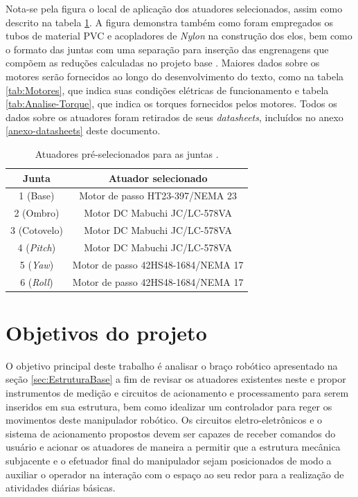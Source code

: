 Nota-se pela figura o local de aplicação dos atuadores selecionados, assim como descrito na tabela \ref{tab:AtuadoresPre}. A figura demonstra também como
foram empregados os tubos de material PVC e acopladores de \textit{Nylon} na construção dos elos, bem como o formato das juntas com uma separação para inserção
das engrenagens que compõem as reduções calculadas no projeto base \cite{fernando2019assistivo}. Maiores dados sobre os motores serão
fornecidos ao longo do desenvolvimento do texto, como na tabela \ref{tab:Motores}, que indica suas condições elétricas de funcionamento
e tabela \ref{tab:Analise-Torque}, que indica os torques fornecidos pelos motores. Todos os dados sobre os atuadores foram retirados
de seus \textit{datasheets}, incluídos no anexo \ref{anexo-datasheets} deste documento.

\begin{table}[h]
\begin{centering}  

\begin{tabular}{|c|c|}
    \hline
    Junta & Atuador selecionado \tabularnewline
    \hline
    \hline
    1 (Base) & Motor de passo HT23-397/NEMA 23 \tabularnewline
    \hline
    2 (Ombro) & Motor DC Mabuchi JC/LC-578VA \tabularnewline
    \hline
    3 (Cotovelo) & Motor DC Mabuchi JC/LC-578VA \tabularnewline
    \hline
    4 (\textit{Pitch}) & Motor DC Mabuchi JC/LC-578VA \tabularnewline
    \hline
    5 (\textit{Yaw}) & Motor de passo 42HS48-1684/NEMA 17 \tabularnewline
    \hline
    6 (\textit{Roll}) & Motor de passo 42HS48-1684/NEMA 17 \tabularnewline
    \hline
\end{tabular}

\caption{Atuadores pré-selecionados para as juntas \cite{fernando2019assistivo}.}
\label{tab:AtuadoresPre}

\par\end{centering}
\end{table}

\section{Objetivos do projeto}

O objetivo principal deste trabalho é analisar o braço robótico apresentado na seção \ref{sec:EstruturaBase} a fim de revisar os atuadores existentes neste e
propor instrumentos de medição e circuitos de acionamento e processamento para serem inseridos em sua estrutura, bem como idealizar um controlador para reger 
os movimentos deste manipulador robótico. 
Os circuitos eletro-eletrônicos e o sistema de acionamento propostos devem
ser capazes de receber comandos do usuário e acionar os atuadores de 
maneira a permitir que a estrutura mecânica subjacente e o efetuador 
final do manipulador sejam posicionados de modo a auxiliar o operador 
na interação com o espaço ao seu redor para a realização de atividades
diárias básicas.


